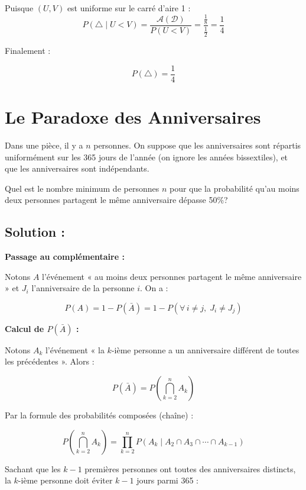 Puisque $(U,V)$ est uniforme sur le carré d'aire 1 :
\[
P(\triangle \mid U < V) = \frac{\mathcal{A}(\mathcal{D})}{P(U<V)} = \frac{\frac{1}{8}}{\frac{1}{2}} = \frac{1}{4}
\]

Finalement :

\[
\boxed{P(\triangle) = \frac{1}{4}}
\]



\section{Le Paradoxe des Anniversaires}

\begin{exerciseBox}
Dans une pièce, il y a $n$ personnes. On suppose que les anniversaires sont répartis uniformément sur les 365 jours de l'année (on ignore les années bissextiles), et que les anniversaires sont indépendants.

Quel est le nombre minimum de personnes $n$ pour que la probabilité qu'au moins deux personnes partagent le même anniversaire dépasse 50\%?
\end{exerciseBox}



\subsection*{Solution :}

\textbf{Passage au complémentaire :}

Notons $A$ l'événement « au moins deux personnes partagent le même anniversaire » et $J_i$ l'anniversaire de la personne $i$. On a :

\[
P(A) = 1 - P(\bar{A}) = 1 - P\!\left(\forall\, i \neq j,\; J_i \neq J_j\right)
\]

\bigskip

\textbf{Calcul de $P(\bar{A})$ :}

Notons $A_k$ l'événement « la $k$-ième personne a un anniversaire différent de toutes les précédentes ». Alors :

\[
P(\bar{A}) = P\!\left(\bigcap_{k=2}^{n} A_k\right)
\]

Par la formule des probabilités composées (chaîne) :

\[
P\!\left(\bigcap_{k=2}^{n} A_k\right) = \prod_{k=2}^{n} P\!\left(A_k \mid A_2 \cap A_3 \cap \cdots \cap A_{k-1}\right)
\]

Sachant que les $k-1$ premières personnes ont toutes des anniversaires distincts, la $k$-ième personne doit éviter $k-1$ jours parmi 365 :

